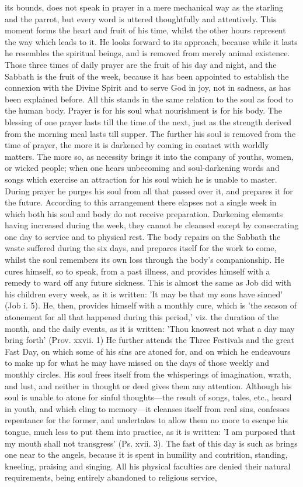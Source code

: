 \documentclass[12pt]{article}
\begin{document}
its bounds, does not speak in prayer in a mere mechanical way as the starling and the parrot, but every word is uttered thoughtfully and attentively. This moment forms the heart and fruit of his time, whilst the other hours represent the way which leads to it. He looks forward to its approach, because while it lasts he resembles the spiritual beings, and is removed from merely animal existence. Those three times of daily prayer are the fruit of his day and night, and the Sabbath is the fruit of the week, because it has been appointed to establish the connexion with the Divine Spirit and to serve God in joy, not in sadness, as has been explained before. All this stands in the same relation to the soul as food to the human body. Prayer is for his soul what nourishment is for his body. The blessing of one prayer lasts till the time of the next, just as the strength derived from the morning meal lasts till supper. The further his soul is removed from the time of prayer, the more it is darkened by coming in contact with worldly matters. The more so, as necessity brings it into the company of youths, women, or wicked people; when one hears unbecoming and soul-darkening words and songs which exercise an attraction for his soul which he is unable to master. During prayer he purges his soul from all that passed over it, and prepares it for the future. According to this arrangement there elapses not a single week in which both his soul and body do not receive preparation. Darkening elements having increased during the week, they cannot be cleansed except by consecrating one day to service and to physical rest. The body repairs on the Sabbath the waste suffered during the six days, and prepares itself for the work to come, whilst the soul remembers its own loss through the body's companionship. He cures himself, so to speak, from a past illness, and provides himself with a remedy to ward off any future sickness. This is almost the same as Job did with his children every week, as it is written: 'It may be that my sons have sinned' (Job i. 5). He, then, provides himself with a monthly cure, which is 'the season of atonement for all that happened during this period,' viz. the duration of the month, and the daily events, as it is written: 'Thou knowest not what a day may bring forth' (Prov. xxvii. 1) He further attends the Three Festivals and the great Fast Day, on which some of his sins are atoned for, and on which he endeavours to make up for what he may have missed on the days of those weekly and monthly circles. His soul frees itself from the whisperings of imagination, wrath, and lust, and neither in thought or deed gives them any attention. Although his soul is unable to atone for sinful thoughts---the result of songs, tales, etc., heard in youth, and which cling to memory---it cleanses itself from real sins, confesses repentance for the former, and undertakes to allow them no more to escape his tongue, much less to put them into practice, as it is written: 'I am purposed that my mouth shall not transgress' (Ps. xvii. 3). The fast of this day is such as brings one near to the angels, because it is spent in humility and contrition, standing, kneeling, praising and singing. All his physical faculties are denied their natural requirements, being entirely abandoned to religious service, 
\end{document}
